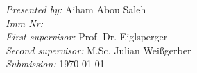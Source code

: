 \begin{titlepage}
{}
\vspace*{20mm}
\begin{tabbing}
\hspace*{4cm}\textit{Presented by:} \hspace*{1.2cm}\= Aiham Abou Saleh \\
\hspace*{4cm}\textit{Imm Nr:}  \\
\hspace*{4cm}\textit{First supervisor:} \> Prof. Dr. Eiglsperger\\
\hspace*{4cm}\textit{Second supervisor:} \> M.Sc. Julian Weißgerber\\
\hspace*{4cm}\textit{Submission:} \> \today
\end{tabbing}
\end{titlepage}